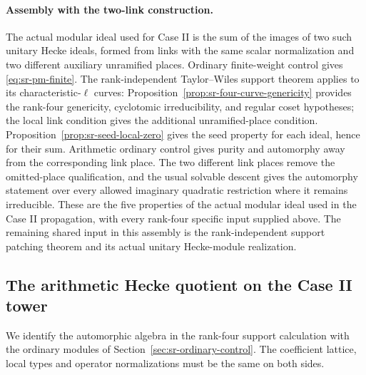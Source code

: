 \paragraph{Assembly with the two-link construction.}
The actual modular ideal used for Case II is the sum of the
images of two such unitary Hecke ideals, formed from links
with the same scalar normalization and two different
auxiliary unramified places.
Ordinary finite-weight control gives
\eqref{eq:sr-pm-finite}.
The rank-independent Taylor--Wiles support theorem applies
to its characteristic-\(\ell\) curves:
Proposition~\ref{prop:sr-four-curve-genericity} provides the
rank-four genericity, cyclotomic irreducibility, and regular
coset hypotheses; the local link condition gives the
additional unramified-place condition.
Proposition~\ref{prop:sr-seed-local-zero} gives the seed
property for each ideal, hence for their sum.
Arithmetic ordinary control gives purity and automorphy away
from the corresponding link place.
The two different link places remove the omitted-place
qualification, and the usual solvable descent gives the
automorphy statement over every allowed imaginary quadratic
restriction where it remains irreducible.
These are the five properties of the actual modular ideal
used in the Case II propagation, with every rank-four
specific input supplied above.
The remaining shared input in this assembly is the
rank-independent support patching theorem and its actual
unitary Hecke-module realization.


\subsection{The arithmetic Hecke quotient on the Case II tower}
\label{subsec:sr-case-two-hecke}
We identify the automorphic algebra in the rank-four support
calculation with the ordinary modules of
Section~\ref{sec:sr-ordinary-control}.
The coefficient lattice, local types and operator
normalizations must be the same on both sides.

